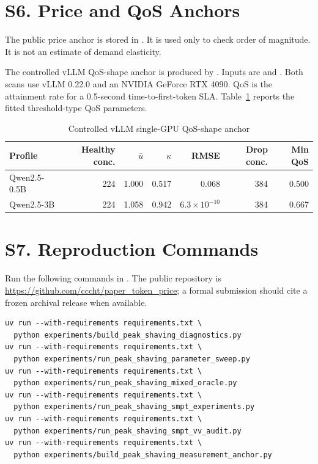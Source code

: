 \documentclass[11pt,a4paper]{article}
\begin{document}
\section*{S6. Price and QoS Anchors}

The public price anchor is stored in
.
It is used only to check order of magnitude. It is not an estimate of demand
elasticity.

The controlled vLLM QoS-shape anchor is produced by
. Inputs are
 and
.
Both scans use vLLM 0.22.0 and an NVIDIA GeForce RTX 4090. QoS is the
attainment rate for a 0.5-second time-to-first-token SLA. Table~\ref{tab:vllm}
reports the fitted threshold-type QoS parameters.

\begin{table}[H]
\centering
\caption{Controlled vLLM single-GPU QoS-shape anchor}
\label{tab:vllm}
\footnotesize
\begin{tabular}{@{}lrrrrrr@{}}
\toprule
Profile & Healthy conc. & $\bar u$ & $\kappa$ & RMSE & Drop conc. & Min QoS \\
\midrule
Qwen2.5-0.5B & 224 & 1.000 & 0.517 & 0.068 & 384 & 0.500 \\
Qwen2.5-3B & 224 & 1.058 & 0.942 & $6.3\times10^{-10}$ & 384 & 0.667 \\
\bottomrule
\end{tabular}
\end{table}

\section*{S7. Reproduction Commands}

Run the following commands in
. The public
repository is \url{https://github.com/cccht/paper_token_price}; a formal
submission should cite a frozen archival release when available.

\begin{verbatim}
uv run --with-requirements requirements.txt \
  python experiments/build_peak_shaving_diagnostics.py
uv run --with-requirements requirements.txt \
  python experiments/run_peak_shaving_parameter_sweep.py
uv run --with-requirements requirements.txt \
  python experiments/run_peak_shaving_mixed_oracle.py
uv run --with-requirements requirements.txt \
  python experiments/run_peak_shaving_smpt_experiments.py
uv run --with-requirements requirements.txt \
  python experiments/run_peak_shaving_smpt_vv_audit.py
uv run --with-requirements requirements.txt \
  python experiments/build_peak_shaving_measurement_anchor.py
\end{verbatim}
\end{document}
